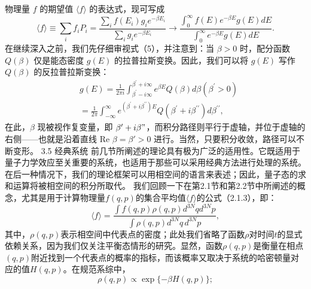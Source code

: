 物理量 \(f\) 的期望值 \(\langle f\rangle\) 的表达式，现可写成
\begin{equation}\tag{3.3.21}\label{eq:3.3.21}
\langle f \rangle \equiv \sum _ { i } f _ { i } P _ { i } = \frac { \sum _ { i } f ( E _ { i } ) g _ { i } e ^{- \beta E _ { i} } } { \sum _ { i } g _ { i } e ^{- \beta E _ { i} } } \rightarrow \frac { \int _ { 0 } ^{\infty} f ( E ) e ^{- \beta E} g ( E ) d E } { \int _ { 0 } ^{\infty} e ^{- \beta E} g ( E ) d E } .
\end{equation}
在继续深入之前，我们先仔细审视式（5），并注意到：当 \(\beta > 0\) 时，配分函数 \(Q(\beta)\) 仅是能态密度 \(g(E)\) 的拉普拉斯变换。因此，我们可以将 \(g(E)\) 写作 \(Q(\beta)\) 的反拉普拉斯变换：
\begin{equation}\tag{3.3.22}\label{eq:3.3.22}
\begin{array}{rl} & { g ( E ) = \frac { 1 } { 2 \pi i } \int _ { \beta ^{\prime} - i \infty } ^{\beta ^ { \prime} + i \infty } e ^{\beta E} Q ( \beta ) d \beta  ( \beta ^{\prime} > 0 ) } \\& { = \frac { 1 } { 2 \pi } \int _ { - \infty } ^{\infty} e ^{( \beta ^ { \prime} + i \beta ^{\prime \prime} ) E } Q ( \beta ^{\prime} + i \beta ^{\prime \prime} ) d \beta ^{\prime \prime} , } \end{array}
\end{equation}
在此，\(\beta\) 现被视作复变量，即 \(\beta' + i\beta"\)，而积分路径则平行于虚轴，并位于虚轴的右侧——也就是沿着直线 Re \(\beta = \beta' > 0\) 进行。当然，只要积分收敛，路径可以不断变形。
3.5 经典系统
前几节所阐述的理论具有极为广泛的适用性。它既适用于量子力学效应至关重要的系统，也适用于那些可以采用经典方法进行处理的系统。在后一种情况下，我们的理论框架可以用相空间的语言来表述；因此，量子态的求和运算将被相空间的积分所取代。
我们回顾一下在第2.1节和第2.2节中所阐述的概念，尤其是用于计算物理量\(f(q,p)\)的集合平均值\(\langle f \rangle\)的公式（2.1.3），即：
\begin{equation}\tag{3.5.1}\label{eq:3.5.1}
\langle f \rangle = \frac { \int f ( q , p ) \rho ( q , p ) d ^{3 N} q d ^{3 N} p } { \int \rho ( q , p ) d ^{3 N} q \, d ^{3 N} p } ,
\end{equation}
其中，\(\rho(q,p)\)表示相空间中代表点的密度；此处我们省略了函数\(\rho\)对时间\(t\)的显式依赖关系，因为我们仅关注平衡态情形的研究。显然，函数\(\rho(q,p)\)是衡量在相点\((q,p)\)附近找到一个代表点的概率的指标，而该概率又取决于系统的哈密顿量对应的值\(H(q,p)\)。在规范系综中，
\begin{equation}\tag{3.5.2}\label{eq:3.5.2}
\rho ( q , p ) \propto \exp \{ - \beta H ( q , p ) \} ;
\end{equation}
